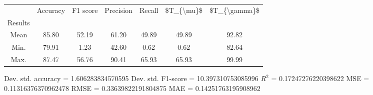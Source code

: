 \begin{tabular}{|c|c|c|c|c|c|c|}
\toprule
{} &  Accuracy &  F1 score &  Precision &  Recall &  \$T\_\{\textbackslash mu\}\$ &  \$T\_\{\textbackslash gamma\}\$ \\
Results &           &           &            &         &            &               \\
\hline
Mean    &     85.80 &     52.19 &      61.20 &   49.89 &      49.89 &         92.82 \\
Min.    &     79.91 &      1.23 &      42.60 &    0.62 &       0.62 &         82.64 \\
Max.    &     87.47 &     56.76 &      90.41 &   65.93 &      65.93 &         99.99 \\
\bottomrule
\end{tabular}

 Dev. std. accuracy = 1.606283834570595
 Dev. std. F1-score = 10.397310753085996
 $R^2$ = 0.17247276220398622
 MSE = 0.11316376370962478
 RMSE = 0.33639822191804875
 MAE = 0.14251763195908962